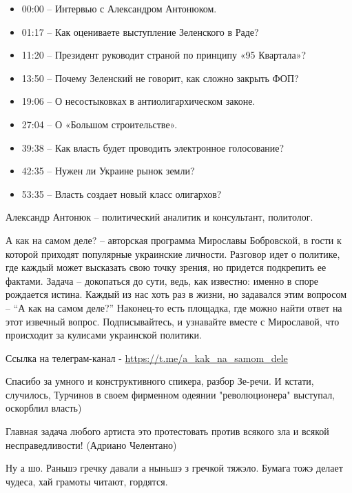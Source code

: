 \begin{itemize}
\begin{itemize}
\begin{multicols}{2}
\begin{itemize}
  \item 00:00 – Интервью с Александром Антонюком.
  \item 01:17 – Как оцениваете выступление Зеленского в Раде?
  \item 11:20 – Президент руководит страной по принципу «95 Квартала»?
  \item 13:50 – Почему Зеленский не говорит, как сложно закрыть ФОП?
  \item 19:06 – О несостыковках в антиолигархическом законе.
  \item 27:04 – О «Большом строительстве».
  \item 39:38 – Как власть будет проводить электронное голосование?
  \item 42:35 – Нужен ли Украине рынок земли?
  \item 53:35 – Власть создает новый класс олигархов?
\end{itemize}

Александр Антонюк – политический аналитик и консультант, политолог.

А как на самом деле? – авторская программа Мирославы Бобровской, в гости к
которой приходят популярные украинские личности. Разговор идет о политике, где
каждый может высказать свою точку зрения, но придется подкрепить ее фактами.
Задача – докопаться до сути, ведь, как известно: именно в споре рождается
истина. Каждый из нас хоть раз в жизни, но задавался этим вопросом – \enquote{А как на
самом деле?} Наконец-то есть площадка, где можно найти ответ на этот извечный
вопрос.  Подписывайтесь, и узнавайте вместе с Мирославой, что происходит за
кулисами украинской политики. 

Ссылка на телеграм-канал - \url{https://t.me/a_kak_na_samom_dele} 



Спасибо за умного и конструктивного спикера, разбор Зе-речи. И кстати,
случилось, Турчинов в своем фирменном одеянии "революционера" выступал,
оскорблил власть)


Главная задача любого артиста это протестовать против всякого зла и всякой
несправедливости! (Адриано Челентано)


Ну а шо. Раньшэ гречку давали а ныньшэ з гречкой тяжэло. Бумага тожэ делает
чудеса, хай грамоты читают, гордятся.


\end{multicols}
\end{itemize}
\end{itemize}
